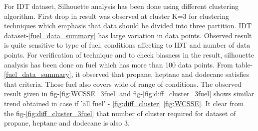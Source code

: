 \documentclass[preprint,12pt]{elsarticle}
\begin{document}
					 For IDT dataset, Silhouette analysis has been  done using different clustering algorithm. First drop in result was observed at cluster K=3 for clustering techniques which emphasis that data should be divided into three partition. IDT dataset-\ref{fuel_data_summary} has large variation in data points. Observed result is quite sensitive to type of fuel, conditions affecting to IDT and number of data points. For verification of technique and to check biasness in the result, silhouette analysis has been done on fuel which has more than 100 data points. From table-\ref{fuel_data_summary}, it observed that propane, heptane and dodecane satisfies that criteria. Those fuel also covers wide of range of conditions. The observed result given in fig-\ref{fig:WCSSE_3fuel} and fig-\ref{fig:diff_cluster_3fuel} shows similar trend obtained in case if 'all fuel' - \ref{fig:diff_cluster} \ref{fig:WCSSE}. It clear from the fig-\ref{fig:diff_cluster_3fuel} that number of cluster required for dataset of propane, heptane and dodecane is also 3.
\end{document}

